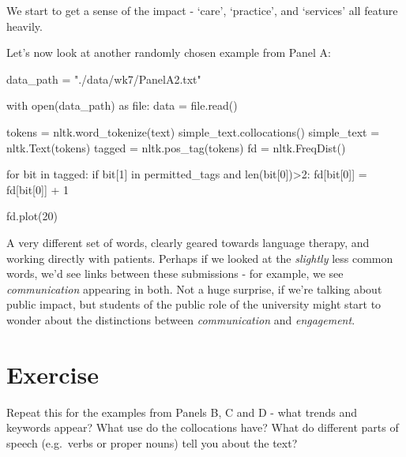 \documentclass[
  letterpaper,
  DIV=11,
  numbers=noendperiod]{scrreprt}
\newenvironment{Shaded}{\begin{snugshade}}{\end{snugshade}}
\newcommand{\BuiltInTok}[1]{\textcolor[rgb]{0.00,0.23,0.31}{#1}}
\newcommand{\ControlFlowTok}[1]{\textcolor[rgb]{0.00,0.23,0.31}{#1}}
\newcommand{\DecValTok}[1]{\textcolor[rgb]{0.68,0.00,0.00}{#1}}
\newcommand{\ImportTok}[1]{\textcolor[rgb]{0.00,0.46,0.62}{#1}}
\newcommand{\KeywordTok}[1]{\textcolor[rgb]{0.00,0.23,0.31}{#1}}
\newcommand{\NormalTok}[1]{\textcolor[rgb]{0.00,0.23,0.31}{#1}}
\newcommand{\OperatorTok}[1]{\textcolor[rgb]{0.37,0.37,0.37}{#1}}
\newcommand{\StringTok}[1]{\textcolor[rgb]{0.13,0.47,0.30}{#1}}
\begin{document}
We start to get a sense of the impact - `care', `practice', and
`services' all feature heavily.

Let's now look at another randomly chosen example from Panel A:

\begin{Shaded}
\begin{Highlighting}[]
\NormalTok{data\_path }\OperatorTok{=} \StringTok{"./data/wk7/PanelA2.txt"}

\ControlFlowTok{with} \BuiltInTok{open}\NormalTok{(data\_path) }\ImportTok{as} \BuiltInTok{file}\NormalTok{:}
\NormalTok{    data }\OperatorTok{=} \BuiltInTok{file}\NormalTok{.read()}

\NormalTok{tokens }\OperatorTok{=}\NormalTok{ nltk.word\_tokenize(text)}
\NormalTok{simple\_text.collocations()}
\NormalTok{simple\_text }\OperatorTok{=}\NormalTok{ nltk.Text(tokens)}
\NormalTok{tagged }\OperatorTok{=}\NormalTok{ nltk.pos\_tag(tokens)}
\NormalTok{fd }\OperatorTok{=}\NormalTok{ nltk.FreqDist()}

\ControlFlowTok{for}\NormalTok{ bit }\KeywordTok{in}\NormalTok{ tagged:}
    \ControlFlowTok{if}\NormalTok{ bit[}\DecValTok{1}\NormalTok{] }\KeywordTok{in}\NormalTok{ permitted\_tags }\KeywordTok{and} \BuiltInTok{len}\NormalTok{(bit[}\DecValTok{0}\NormalTok{])}\OperatorTok{\textgreater{}}\DecValTok{2}\NormalTok{:}
\NormalTok{        fd[bit[}\DecValTok{0}\NormalTok{]] }\OperatorTok{=}\NormalTok{ fd[bit[}\DecValTok{0}\NormalTok{]] }\OperatorTok{+} \DecValTok{1}
        
\NormalTok{fd.plot(}\DecValTok{20}\NormalTok{)}
\end{Highlighting}
\end{Shaded}

A very different set of words, clearly geared towards language therapy,
and working directly with patients. Perhaps if we looked at the
\emph{slightly} less common words, we'd see links between these
submissions - for example, we see \emph{communication} appearing in
both. Not a huge surprise, if we're talking about public impact, but
students of the public role of the university might start to wonder
about the distinctions between \emph{communication} and
\emph{engagement}.

\hypertarget{exercise-9}{%
\section{Exercise}\label{exercise-9}}

Repeat this for the examples from Panels B, C and D - what trends and
keywords appear? What use do the collocations have? What do different
parts of speech (e.g.~verbs or proper nouns) tell you about the text?
\end{document}
